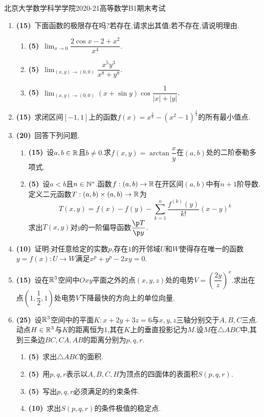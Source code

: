 \documentclass{ctexart}
\begin{document}
\pagestyle{empty}

\begin{center}\Large
    北京大学数学科学学院2020-21高等数学B1期末考试
\end{center}
\begin{enumerate}[leftmargin=*,label=\textbf{\arabic*.}]
    \item \textbf{(15)}\ 下面函数的极限存在吗?若存在,请求出其值;若不存在,请说明理由.
        \begin{enumerate}[label=\textbf{(\arabic*)},leftmargin=*]
            \item \textbf{(5)}\ $\displaystyle\lim_{x\to0}\dfrac{2\cos x-2+x^2}{x^4}$.
            \item \textbf{(5)}\ $\displaystyle\lim_{(x,y)\to(0,0)}\dfrac{x^5y^3}{x^8+y^8}$.
            \item \textbf{(5)}\ $\displaystyle\lim_{(x,y)\to(0,0)}(x+\sin y)\cos\dfrac{1}{|x|+|y|}$.
        \end{enumerate}
    \item \textbf{(15)}\ 求闭区间$[-1,1]$上的函数$f(x)=x^{\frac23}-\left(x^2-1\right)^\frac13$的所有最小值点.
    \item \textbf{(20)}\ 回答下列问题.
        \begin{enumerate}[label=\textbf{(\arabic*)},leftmargin=*]
            \item \textbf{(15)}\ 设$a,b\in\mathbb{R}$且$b\neq0$.求$f(x,y)=\arctan\dfrac xy$在$(a,b)$处的二阶泰勒多项式.
            \item \textbf{(5)}\ 设$a<b$且$n\in\mathbb{N}^*$.函数$f:(a,b)\to\mathbb{R}$在开区间$(a,b)$中有$n+1$阶导数.定义二元函数$T:(a,b)\times(a,b)\to\mathbb{R}$为
                \[T(x,y)=f(x)-f(y)-\sum_{k=1}^n\dfrac{f^{(k)}(y)}{k!}(x-y)^k\]
                求出$T(x,y)$对$y$的一阶偏导函数$\dfrac{\p T}{\p y}$.
        \end{enumerate}
    \item \textbf{(10)}\ 证明:对任意给定的实数$p$,存在$1$的开邻域$U$和$W$使得存在唯一的函数$y=f(x):U\to W$满足$x^p+y^p-2xy=0$.
    \item \textbf{(15)}\ 设在$\mathbb{R}^3$空间中$Oxy$平面之外的点$(x,y,z)$处的电势$V=\left(\dfrac{2y}z\right)^x$.求出在点$\left(1,\dfrac12,1\right)$处电势$V$下降最快的方向上的单位向量.
    \item \textbf{(25)}\ 设$\mathbb{R}^3$空间中的平面$K:x+2y+3z=6$与$x,y,z$三轴分别交于$A,B,C$三点.动点$H\in\mathbb{R}^3$与$K$的距离恒为$1$,其在$K$上的垂直投影记为$M$.设$M$在$\triangle ABC$中,其到三条边$BC,CA,AB$的距离分别为$p,q,r$.
            \begin{enumerate}[label=\textbf{(\arabic*)},leftmargin=*]
                \item \textbf{(5)}\ 求出$\triangle ABC$的面积.
                \item \textbf{(5)}\ 用$p,q,r$表示以$A,B,C,H$为顶点的四面体的表面积$S(p,q,r)$.
                \item \textbf{(5)}\ 写出$p,q,r$必须满足的约束条件.
                \item \textbf{(10)}\ 求出$S(p,q,r)$的条件极值的稳定点.
            \end{enumerate}
\end{enumerate}
\end{document}

